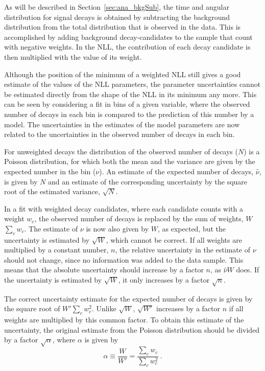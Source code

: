 As will be described in Section~\ref{sec:ana_bkgSub}, the time and angular distribution for \BstoJpsiKK{} signal decays is obtained by
subtracting the background distribution from the total distribution that is observed in the data. This is accomplished by adding background
decay-candidates to the sample that count with negative weights. In the NLL, the contribution of each decay candidate is then multiplied
with the value of its weight.

Although the position of the minimum of a weighted NLL still gives a good estimate of the values of the NLL parameters, the parameter
uncertainties cannot be estimated directly from the shape of the NLL in its minimum any more. This can be seen by considering a fit in bins
of a given variable, where the observed number of decays in each bin is compared to the prediction of this number by a model. The
uncertainties in the estimates of the model parameters are now related to the uncertainties in the observed number of decays in each bin.

For unweighted decays the distribution of the observed number of decays ($N$) is a Poisson distribution, for which both the mean and the
variance are given by the expected number in the bin ($\nu$). An estimate of the expected number of decays, $\hat{\nu}$, is given by $N$
and an estimate of the corresponding uncertainty by the square root of the estimated variance, $\sqrt{N}$.

In a fit with weighted decay candidates, where each candidate counts with a weight $w_c$, the observed number of decays is replaced by the
sum of weights, $W$\textequiv$\sum_c w_c$. The estimate of $\nu$ is now also given by $W$, as expected, but the uncertainty is estimated by
$\sqrt{W}$, which cannot be correct. If all weights are multiplied by a constant number, $n$, the relative uncertainty in the estimate of
$\nu$ should not change, since no information was added to the data sample. This means that the absolute uncertainty should increase by a
factor $n$, as $\hat{\nu}$\texteq$W$ does. If the uncertainty is estimated by $\sqrt{W}$, it only increases by a factor $\sqrt{n}$.

The correct uncertainty estimate for the expected number of decays is given by the square root of $W'$\textequiv$\sum_c w_c^2$. Unlike
$\sqrt{W}$, $\sqrt{W'}$ increases by a factor $n$ if all weights are multiplied by this common factor. To obtain this estimate of the
uncertainty, the original estimate from the Poisson distribution should be divided by a factor $\sqrt{\alpha}$, where $\alpha$ is given by
\begin{equation}
  \alpha \equiv \frac{W}{W'} = \frac{\sum_c w_c}{\sum_c w_c^2} \ .
\end{equation}

